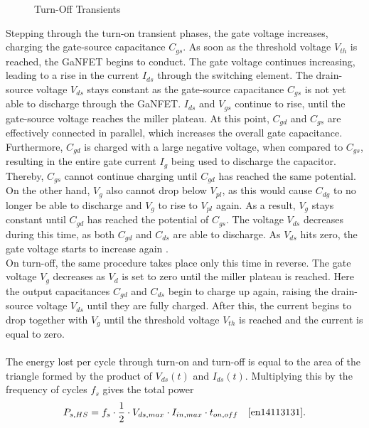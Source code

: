 \begin{figure}[H]
\begin{minipage}{0.5\textwidth}
        \caption{Turn-Off Transients}
        \label{fig:MOSFET_transient_turnoff}
    \end{minipage}\hfill
\end{figure}
Stepping through the turn-on transient phases, the gate voltage increases, charging the gate-source capacitance $C_{gs}$. As soon as the threshold voltage $V_{th}$ is reached, the \ac{GaNFET} begins to conduct. The gate voltage continues increasing, leading to a rise in the current $I_{ds}$ through the switching element. The drain-source voltage $V_{ds}$ stays constant as the gate-source capacitance $C_{gs}$ is not yet able to discharge through the \ac{GaNFET}. $I_{ds}$ and $V_{gs}$ continue to rise, until the gate-source voltage reaches the miller plateau. At this point, $C_{gd}$ and $C_{gs}$ are effectively connected in parallel, which increases the overall gate capacitance. Furthermore, $C_{gd}$ is charged with a large negative voltage, when compared to $C_{gs}$, resulting in the entire gate current $I_g$ being used to discharge the capacitor. Thereby, $C_{gs}$ cannot continue charging until $C_{gd}$ has reached the same potential. On the other hand, $V_g$ also cannot drop below $V_{pl}$, as this would cause $C_{dg}$ to no longer be able to discharge and $V_g$ to rise to $V_{pl}$ again. As a result, $V_g$ stays constant until $C_{gd}$ has reached the potential of $C_{gs}$. The voltage $V_{ds}$ decreases during this time, as both $C_{gd}$ and $C_{ds}$ are able to discharge. As $V_{ds}$ hits zero, the gate voltage starts to increase again \cite{en14113131, An_Accurate_Approach_for_Calculating_the_Efficiency_of_a_SBC}.\\
On turn-off, the same procedure takes place only this time in reverse. The gate voltage $V_g$ decreases as $V_d$ is set to zero until the miller plateau is reached. Here the output capacitances $C_{gd}$ and $C_{ds}$ begin to charge up again, raising the drain-source voltage $V_{ds}$ until they are fully charged. After this, the current begins to drop together with $V_g$ until the threshold voltage $V_{th}$ is reached and the current is equal to zero.\\\\
The energy lost per cycle through turn-on and turn-off is equal to the area of the triangle formed by the product of $V_{ds}(t)$ and $I_{ds}(t)$. Multiplying this by the frequency of cycles $f_s$ gives the total power 
\begin{equation}
    P_{s,HS} = f_s \cdot \frac{1}{2} \cdot V_{ds,max} \cdot I_{in,max} \cdot t_{on,off} \quad\text{\cite{en14113131}.}
    \label{eq:switching_power} 
\end{equation}
